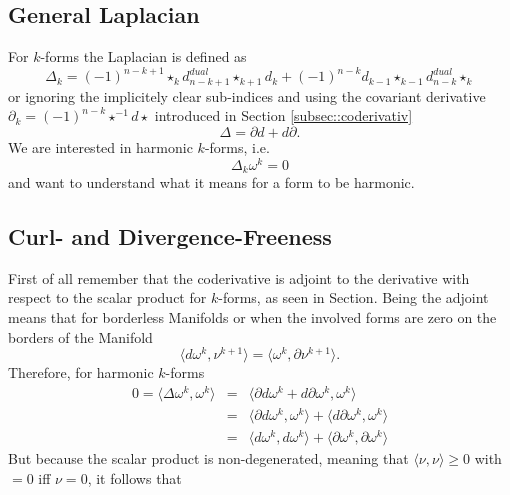 

\subsection{General Laplacian}
For $k$-forms the Laplacian is defined as 
\[\Delta_k = (-1)^{n-k+1}\star_{k} d_{n-k+1}^{dual} \star_{k+1}d_k + (-1)^{n-k}d_{k-1}\star_{k-1}d_{n-k}^{dual} \star_{k}\]
or ignoring the implicitely clear sub-indices and using the covariant derivative $\partial_k = (-1)^{n-k}\star^{-1} d \star$ introduced in Section \ref{subsec::coderivativ} 
\[\Delta = \partial d + d \partial .\]
We are interested in harmonic $k$-forms, i.e.
\[\Delta_k \omega^k = 0\]
and want to understand what it means for a form to be harmonic. 

\subsection{Curl- and Divergence-Freeness}
First of all remember that the coderivative is adjoint to the derivative with respect to the scalar product for $k$-forms, as seen in Section. %
Being the adjoint means that for borderless Manifolds or when the involved forms are zero on the borders of the Manifold%
\[\langle d\omega^k, \nu^{k+1} \rangle = \langle \omega^k,\partial\nu^{k+1}\rangle.\]
Therefore, for harmonic $k$-forms
\begin{eqnarray*}0=\langle\Delta\omega^k,\omega^k\rangle &= &\langle \partial d\omega^k + d \partial \omega^k, \omega^k\rangle \\
 &=& \langle \partial d\omega^k, \omega^k\rangle + \langle d \partial \omega^k, \omega^k\rangle \\
 &=& \langle d\omega^k,d\omega^k\rangle + \langle \partial\omega^k,\partial\omega^k\rangle
\end{eqnarray*}
But because the scalar product is non-degenerated, meaning that $\langle \nu,\nu\rangle \geq 0$  with $=0$ iff $\nu=0$, it follows that
